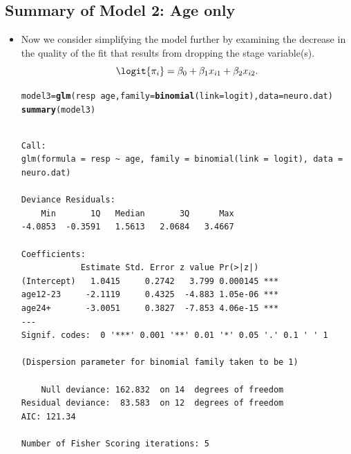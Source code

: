 \documentclass{article}\usepackage[]{graphicx}\usepackage[svgnames]{xcolor}
\makeatletter
\newcommand{\hlopt}[1]{\textcolor[rgb]{0,0,0}{#1}}%
\newcommand{\hlstd}[1]{\textcolor[rgb]{0.345,0.345,0.345}{#1}}%
\newcommand{\hlkwb}[1]{\textcolor[rgb]{0.69,0.353,0.396}{#1}}%
\newcommand{\hlkwc}[1]{\textcolor[rgb]{0.333,0.667,0.333}{#1}}%
\newcommand{\hlkwd}[1]{\textcolor[rgb]{0.737,0.353,0.396}{\textbf{#1}}}%
\newenvironment{kframe}{%
 \def\at@end@of@kframe{}%
 \ifinner\ifhmode%
  \def\at@end@of@kframe{\end{minipage}}%
  \begin{minipage}{\columnwidth}%
 \fi\fi%
 \def\FrameCommand##1{\hskip\@totalleftmargin \hskip-\fboxsep
 \colorbox{shadecolor}{##1}\hskip-\fboxsep
     \hskip-\linewidth \hskip-\@totalleftmargin \hskip\columnwidth}%
 \MakeFramed {\advance\hsize-\width
   \@totalleftmargin\z@ \linewidth\hsize
   \@setminipage}}%
 {\par\unskip\endMakeFramed%
 \at@end@of@kframe}
\newenvironment{knitrout}{}{} %
\makeatother
\begin{document}
\subsection*{Summary of Model 2: Age only}
\begin{itemize}
    \item Now we consider simplifying the model further by examining the decrease in
          the quality of the fit that results from dropping the stage variable(s).
          \[ \logit{\pi_i}=\beta_0+\beta_1x_{i1}+\beta_2x_{i2}. \]
\begin{knitrout}
\color{fgcolor}\begin{kframe}
\begin{alltt}
\hlstd{model3} \hlkwb{=} \hlkwd{glm}\hlstd{(resp} \hlopt{~} \hlstd{age,} \hlkwc{family} \hlstd{=} \hlkwd{binomial}\hlstd{(}\hlkwc{link} \hlstd{= logit),} \hlkwc{data} \hlstd{= neuro.dat)}
\hlkwd{summary}\hlstd{(model3)}
\end{alltt}
\begin{verbatim}

Call:
glm(formula = resp ~ age, family = binomial(link = logit), data = neuro.dat)

Deviance Residuals: 
    Min       1Q   Median       3Q      Max  
-4.0853  -0.3591   1.5613   2.0684   3.4667  

Coefficients:
            Estimate Std. Error z value Pr(>|z|)    
(Intercept)   1.0415     0.2742   3.799 0.000145 ***
age12-23     -2.1119     0.4325  -4.883 1.05e-06 ***
age24+       -3.0051     0.3827  -7.853 4.06e-15 ***
---
Signif. codes:  0 '***' 0.001 '**' 0.01 '*' 0.05 '.' 0.1 ' ' 1

(Dispersion parameter for binomial family taken to be 1)

    Null deviance: 162.832  on 14  degrees of freedom
Residual deviance:  83.583  on 12  degrees of freedom
AIC: 121.34

Number of Fisher Scoring iterations: 5
\end{verbatim}
\end{kframe}
\end{knitrout}
\end{itemize}
\end{document}
